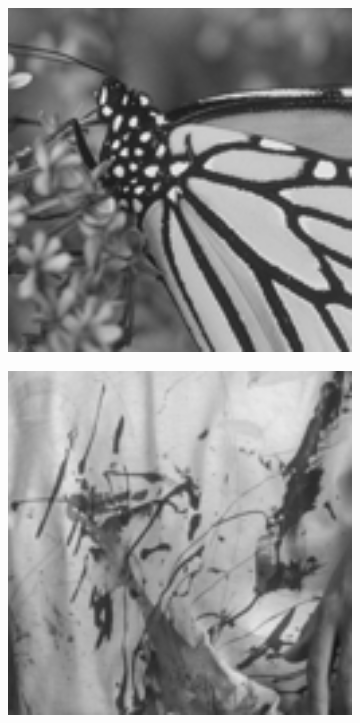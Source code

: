 \begin{figure}
\begin{subfigure}[b]{0.09\textwidth}
    \end{subfigure}
    \hfill
    \begin{subfigure}[b]{0.09\textwidth}
        \centering
        \includegraphics[width=1\textwidth]{images/pgpd/monarch.png}
    \end{subfigure}
    \hfill
    \begin{subfigure}[b]{0.09\textwidth}
        \centering
        \includegraphics[width=1\textwidth]{images/pgpd/paint.png}

\end{subfigure}
\end{figure}
